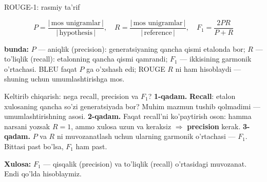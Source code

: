 \documentclass[aspectratio=169,11pt]{beamer}
\newcommand{\bunda}[1]{{\small\textbf{bunda:}\; #1}}
\begin{document}
\begin{frame}{ROUGE-1: rasmiy ta'rif}
  \begin{tcolorbox}[defbox,title={Ta'rif: ROUGE-1 (unigram)}]
    \vspace{-0.4em}
    $$ P = \frac{|\,\text{mos unigramlar}\,|}{|\,\text{hypothesis}\,|}, \quad
       R = \frac{|\,\text{mos unigramlar}\,|}{|\,\text{reference}\,|}, \quad
       F_1 = \frac{2 P R}{P + R} $$
  \end{tcolorbox}
  \vspace{2pt}
  \bunda{$P$ --- aniqlik (precision): generatsiyaning qancha qismi etalonda
  bor; $R$ --- to'liqlik (recall): etalonning qancha qismi qamrandi; $F_1$ ---
  ikkisining garmonik o'rtachasi.}
  \vspace{4pt}
  \footnotesize BLEU faqat $P$ ga o'xshash edi; ROUGE $R$ ni ham hisoblaydi ---
  shuning uchun umumlashtirishga mos.
\end{frame}

\begin{frame}{Keltirib chiqarish: nega recall, precision va $F_1$?}
  \textbf{1-qadam.} \textbf{Recall}: etalon xulosaning qancha so'zi
  generatsiyada bor? Muhim mazmun tushib qolmadimi --- umumlashtirishning asosi.
  \pause
  \textbf{2-qadam.} Faqat recall'ni ko'paytirish oson: hamma narsani yozsak
  $R=1$, ammo xulosa uzun va keraksiz $\Rightarrow$ \textbf{precision} kerak.
  \pause
  \textbf{3-qadam.} $P$ va $R$ ni muvozanatlash uchun ularning garmonik
  o'rtachasi --- $F_1$. Bittasi past bo'lsa, $F_1$ ham past.
  \begin{tcolorbox}[okbox,top=2pt,bottom=2pt]
    \small \textbf{Xulosa:} $F_1$ --- qisqalik (precision) va to'liqlik
    (recall) o'rtasidagi muvozanat. Endi qo'lda hisoblaymiz.
  \end{tcolorbox}
\end{frame}
\end{document}
